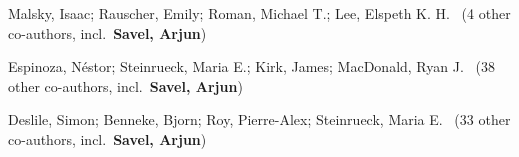 


\item[{\color{numcolor}\scriptsize4}] Malsky, Isaac; Rauscher, Emily; Roman, Michael T.; Lee, Elspeth K. H. \etal\ ({4} other co-authors, incl.\ \textbf{Savel, Arjun})
\item[{\color{numcolor}\scriptsize3}] Espinoza, Néstor; Steinrueck, Maria E.; Kirk, James; MacDonald, Ryan J. \etal\ ({38} other co-authors, incl.\ \textbf{Savel, Arjun})
\item[{\color{numcolor}\scriptsize2}] Deslile, Simon; Benneke, Bjorn; Roy, Pierre-Alex; Steinrueck, Maria E. \etal\ ({33} other co-authors, incl.\ \textbf{Savel, Arjun})
